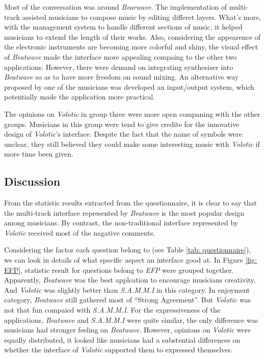 Most of the conversation was around \textit{Bearwave}. The implementation of multi-track assisted musicians to compose music by editing differet layers. What's more, with the management system to handle different sections of music, it helped musicians to extend the length of their works. Also, considering the appearence of the electronic instruments are becoming more colorful and shiny, the visual effect of \textit{Beatwave} made the interface more appealing compaing to the other two applications. However, there were demand on integrating synthesizer into \textit{Beatwave} so as to have more freedom on sound mixing. An alternative way proposed by one of the musicians was developed an input/output system, which potentially made the application more practical.

The opinions on \textit{Volotic} in group three were more open companing with the other groups. Musicians in this group were tend to give credite for the innovative design of \textit{Volotic}'s interface. Despite the fact that the name of symbols were unclear, they still believed they could make some interesting music with \textit{Volotic} if more time been given.

\subsection{Discussion}

From the statistic results extracted from the questionnaire, it is clear to say that the multi-track interface represented by \textit{Beatwave} is the most popular design among musicians. By contrast, the non-traditional interface represented by \textit{Volotic} received most of the nagative comments.

Considering the factor each question belong to (see Table \ref{tab: questionnaire}), we can look in details of what specific aspect an interface good at. In Figure \ref{fig: EFP}, statistic result for questions belong to \textit{EFP} were grouped together. Apparently, \textit{Beatwave} was the best applcation to encourage musicians creativity. And \textit{Volotic} was slightly better than \textit{S.A.M.M.I} in this category. In enjoyment category, \textit{Beatwave} still gathered most of \textquotedblleft{Strong Agreement}\textquotedblright. But \textit{Volotic} was not that fun compaied with \textit{S.A.M.M.I}. For the expressiveness of the applications, \textit{Beatwave} and \textit{S.A.M.M.I} were quite similar, the only difference was musicians had stronger feeling on \textit{Beatwave}. However, opinions on \textit{Volotic} were equally distributed, it looked like musicians had a substential differences on whether the interface of \textit{Volotic} supported them to expressed themselves.

